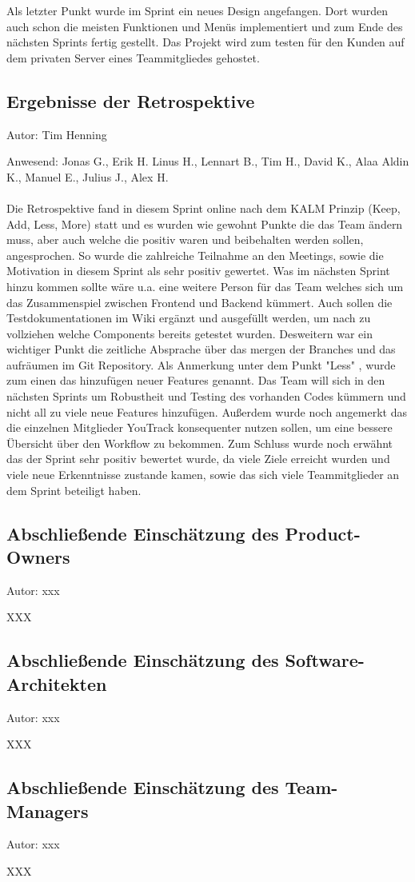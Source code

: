 Als letzter Punkt wurde im Sprint ein neues Design angefangen. Dort wurden auch schon die meisten Funktionen und Menüs implementiert und zum Ende des nächsten Sprints fertig gestellt. Das Projekt wird zum testen für den Kunden auf dem privaten Server eines Teammitgliedes gehostet.


\subsection{Ergebnisse der Retrospektive}
{\small Autor: Tim Henning}

Anwesend: Jonas G., Erik H. Linus H., Lennart B., Tim H., David K., Alaa Aldin K., Manuel E., Julius J., Alex H.\\
\\

Die Retrospektive fand in diesem Sprint online nach dem KALM Prinzip (Keep, Add, Less, More) statt und es wurden wie gewohnt Punkte die das Team ändern muss, aber auch welche die positiv waren und beibehalten werden sollen, angesprochen. So wurde die zahlreiche Teilnahme an den Meetings, sowie die Motivation in diesem Sprint als sehr positiv gewertet. Was im nächsten Sprint hinzu kommen sollte wäre u.a. eine weitere Person für das Team welches sich um das Zusammenspiel zwischen Frontend und Backend kümmert. Auch sollen die Testdokumentationen im Wiki ergänzt und ausgefüllt werden, um nach zu vollziehen welche Components bereits getestet wurden. Desweitern war ein wichtiger Punkt die zeitliche Absprache über das mergen der Branches und das aufräumen im Git Repository. Als Anmerkung unter dem Punkt "Less" , wurde zum einen das hinzufügen neuer Features genannt. Das Team will sich in den nächsten Sprints um Robustheit und Testing des vorhanden Codes kümmern und nicht all zu viele neue Features hinzufügen. Außerdem wurde noch angemerkt das die einzelnen Mitglieder YouTrack konsequenter nutzen sollen, um eine bessere Übersicht über den Workflow zu bekommen. Zum Schluss wurde noch erwähnt das der Sprint sehr positiv bewertet wurde, da viele Ziele erreicht wurden und viele neue Erkenntnisse zustande kamen, sowie das sich viele Teammitglieder an dem Sprint beteiligt haben.

\subsection{Abschließende Einschätzung des Product-Owners}
{\small Autor: xxx}

XXX

\subsection{Abschließende Einschätzung des Software-Architekten}
{\small Autor: xxx}

XXX

\subsection{Abschließende Einschätzung des Team-Managers}
{\small Autor: xxx}

XXX
